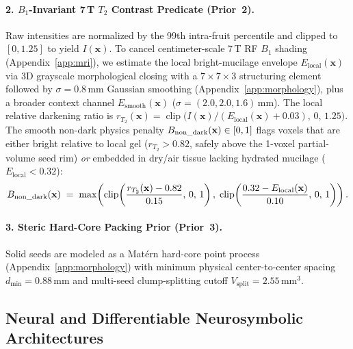 \documentclass[10pt,a4paper]{article}
\renewcommand{\_}{\origunderscore\allowbreak}
\begin{document}
\paragraph{2. $B_1$-Invariant 7\,T $T_2$ Contrast Predicate (Prior~2).}
Raw intensities are normalized by the 99th intra-fruit percentile and clipped to $[0, 1.25]$ to yield $I(\mathbf{x})$. To cancel centimeter-scale 7\,T RF $B_1$ shading (Appendix~\ref{app:mri}), we estimate the local bright-mucilage envelope $E_{\text{local}}(\mathbf{x})$ via 3D grayscale morphological closing with a $7 \times 7 \times 3$ structuring element followed by $\sigma = 0.8\,\text{mm}$ Gaussian smoothing (Appendix~\ref{app:morphology}), plus a broader context channel $E_{\text{smooth}}(\mathbf{x})$ ($\sigma = (2.0, 2.0, 1.6)\,\text{mm}$). The local relative darkening ratio is $r_{T_2}(\mathbf{x}) = \operatorname{clip}\bigl(I(\mathbf{x}) / (E_{\text{local}}(\mathbf{x}) + 0.03),\, 0,\, 1.25\bigr)$. The smooth non-dark physics penalty $B_{\text{non\_dark}}(\mathbf{x}) \in [0, 1]$ flags voxels that are either bright relative to local gel ($r_{T_2} > 0.82$, safely above the 1-voxel partial-volume seed rim) \emph{or} embedded in dry/air tissue lacking hydrated mucilage ($E_{\text{local}} < 0.32$):
\begin{equation}
    B_{\text{non\_dark}}(\mathbf{x}) \;=\; \max\!\left(\operatorname{clip}\!\left(\frac{r_{T_2}(\mathbf{x}) - 0.82}{0.15},\, 0,\, 1\right),\; \operatorname{clip}\!\left(\frac{0.32 - E_{\text{local}}(\mathbf{x})}{0.10},\, 0,\, 1\right)\right).
    \label{eq:non_dark}
\end{equation}

\paragraph{3. Steric Hard-Core Packing Prior (Prior~3).}
Solid seeds are modeled as a Mat\'ern hard-core point process~\cite{matern1986spatial} (Appendix~\ref{app:morphology}) with minimum physical center-to-center spacing $d_{\min} = 0.88\,\text{mm}$ and multi-seed clump-splitting cutoff $V_{\text{split}} = 2.55\,\text{mm}^3$.

\subsection{Neural and Differentiable Neurosymbolic Architectures}
\end{document}
